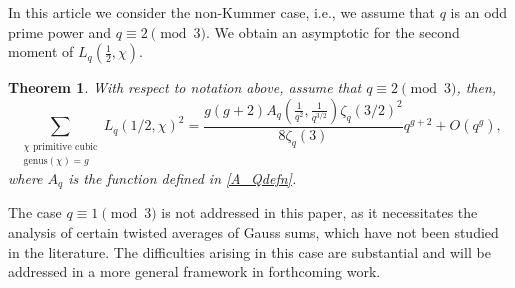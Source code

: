 \documentclass[table]{amsart}
\newtheorem{lthm}{Theorem}
\numberwithin{equation}{section}
\begin{document}
\par In this article we consider the non-Kummer case, i.e., we assume that $q$ is an odd prime power and $q\equiv 2\pmod{3}$. We obtain an asymptotic for the second moment of $L_q(\frac{1}{2}, \chi)$. 

\begin{lthm}\label{main theorem}
   With respect to notation above, assume that $q \equiv 2 \pmod{3}$, then, 
\begin{equation}\label{eqn for main theorem}
\sum_{\substack{\chi \text{ primitive cubic} \\ \mathrm{genus}(\chi) = g}} L_q(1/2, \chi)^2
= \frac{g(g+2)A_q(\frac{1}{q^2}, \frac{1}{q^{3/2}}) \zeta_{q}(3/2)^2}{8\zeta_{q}(3)}q^{g+2} + O(q^{g}),
\end{equation}
where $A_q$ is the function defined in \eqref{A_Qdefn}.
\end{lthm}
\noindent The case $q \equiv 1 \pmod{3}$ is not addressed in this paper, as it necessitates the analysis of certain twisted averages of Gauss sums, which have not been studied in the literature. The difficulties arising in this case are substantial and will be addressed in a more general framework in forthcoming work.
\end{document}
